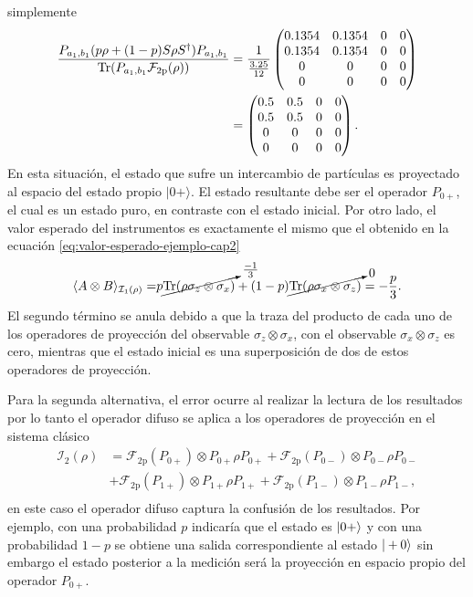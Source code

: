 simplemente\[\begin{split}\dfrac{P_{a_1,b_1}(p\rho+(1-p)S\rho S^\dagger)
P_{a_1,b_1}}{{\rm Tr}(P_{a_1,b_1} \mathcal{F}_{2\text{p}}(\rho))}&=\dfrac{1}{\frac{3.25}{12}}\begin{pmatrix}
        0.1354 &  0.1354  &  0 &  0\\
        0.1354 &  0.1354 &  0 &  0\\
        0 &  0 &  0&  0\\
        0 &  0 &  0 &  0
      \end{pmatrix}\\
      &=\begin{pmatrix}
        0.5 &  0.5 &  0 &  0\\
        0.5 &  0.5 &  0 &  0\\
        0 &  0 &  0&  0\\
        0 &  0 &  0 &  0
      \end{pmatrix}.\\
    \end{split} \] 
En esta situación, el estado que sufre un intercambio de partículas es
proyectado al espacio del estado propio $|0+\rangle$. El estado resultante debe
ser el operador $P_{0+}$, el cual es un estado puro, en contraste con el estado
inicial.
Por otro lado, el valor esperado del instrumentos es exactamente el mismo que el obtenido en la ecuación {\eqref{eq:valor-esperado-ejemplo-cap2}}
\begin{equation}\label{eq:1instrument-ejemplo}\begin{split}\langle A\otimes B\rangle_{\mathcal{I}_1(\rho)}=&p\cancelto{\frac{-1}{3}}{{\rm Tr}(\rho\sigma_z\otimes \sigma_x )}+(1-p)\cancelto{0}{{\rm Tr}(\rho\sigma_x\otimes \sigma_z )}=-\frac{p}{3}.\\
    \end{split}\end{equation} El segundo término se anula debido a que la traza del producto de cada uno de los operadores de proyección del observable $\sigma_z\otimes\sigma_x$, con el observable $\sigma_x\otimes\sigma_z$ es cero, mientras que el estado inicial es una superposición de dos de estos operadores de proyección.



Para la segunda alternativa, el error ocurre al realizar la lectura de los resultados por lo tanto el operador difuso se aplica a los operadores de proyección en el sistema clásico \[\begin{split}\mathcal{I}_2(\rho)&=\mathcal{F}_{2\text{p}}(P_{0+})\otimes P_{0+}\rho P_{0+}+\mathcal{F}_{2\text{p}}(P_{0-})\otimes P_{0-}\rho P_{0-}\\
    &+ \mathcal{F}_{2\text{p}}({P_{1+}})\otimes P_{1+}\rho P_{1+}+\mathcal{F}_{2\text{p}}(P_{1-})\otimes P_{1-}\rho P_{1-}, \\\end{split}\] en este caso el operador difuso captura la confusión de los resultados. Por ejemplo, con una probabilidad $p$ indicaría que el estado es $|0+\rangle$ y con una probabilidad $1-p$ se obtiene una salida correspondiente al estado $|+0\rangle$ sin embargo el estado posterior a la medición será la proyección en espacio propio del operador $P_{0+}$. 
    
